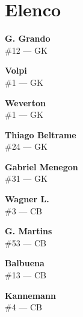 \documentclass[11pt]{article}
\begin{document}
\printindex
\newpage
\section*{Elenco}
\begin{minipage}[t]{0.30\textwidth}
\centering
\textbf{G. Grando}\\
\#12 --- GK\\
\vspace{0.2cm}
\end{minipage}
\hfill
\begin{minipage}[t]{0.30\textwidth}
\centering
\textbf{Volpi}\\
\#1 --- GK\\
\vspace{0.2cm}
\end{minipage}
\hfill
\begin{minipage}[t]{0.30\textwidth}
\centering
\textbf{Weverton}\\
\#1 --- GK\\
\vspace{0.2cm}
\end{minipage}
\vspace{0.5cm}

\begin{minipage}[t]{0.30\textwidth}
\centering
\textbf{Thiago Beltrame}\\
\#24 --- GK\\
\vspace{0.2cm}
\end{minipage}
\hfill
\begin{minipage}[t]{0.30\textwidth}
\centering
\textbf{Gabriel Menegon}\\
\#31 --- GK\\
\vspace{0.2cm}
\end{minipage}
\hfill
\begin{minipage}[t]{0.30\textwidth}
\centering
\textbf{Wagner L.}\\
\#3 --- CB\\
\vspace{0.2cm}
\end{minipage}
\vspace{0.5cm}

\begin{minipage}[t]{0.30\textwidth}
\centering
\textbf{G. Martins}\\
\#53 --- CB\\
\vspace{0.2cm}
\end{minipage}
\hfill
\begin{minipage}[t]{0.30\textwidth}
\centering
\textbf{Balbuena}\\
\#13 --- CB\\
\vspace{0.2cm}
\end{minipage}
\hfill
\begin{minipage}[t]{0.30\textwidth}
\centering
\textbf{Kannemann}\\
\#4 --- CB\\
\vspace{0.2cm}
\end{minipage}
\vspace{0.5cm}
\end{document}
